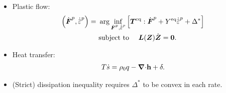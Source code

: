 \begin{frame}
\begin{columns}[T]
\begin{column}{0.4\textwidth}
\begin{itemize}
        \item Plastic flow:
              \begin{align*}
                \left( \dot{\defgrad}^p, \epdot \right) = & \ \arg\inf_{\dot{\defgrad}^p, \epdot} \left[ \bfT^\text{eq}:\dot{\defgrad}^p + Y^\text{eq}\epdot + \Delta^* \right] \\
                                                          & \ \text{subject to }\quad \bfL(\bfZ)\dot{\bfZ} = \bs{0}.                                                            
              \end{align*}
        \item Heat transfer:
              \begin{align*}
                T\dot{s} = \rho_0 q - {\boldsymbol{\nabla} \cdot} \textbf{h} + \delta.
              \end{align*}
        \item (Strict) dissipation inequality requires $\Delta^*$ to be convex in each rate.
      \end{itemize}
      
      
    \end{column}
  \end{columns}
\end{frame}
